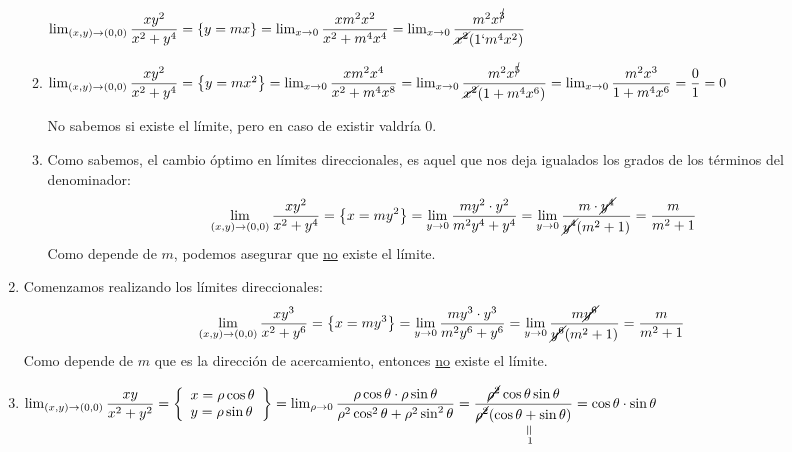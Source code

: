\begin{enumerate}[label=\color{red}\textbf{\arabic*)}, leftmargin=*]
\begin{enumerate}[label=\color{red}\alph*)]
			$\lim_{(x,y)\to(0,0)}\dfrac{xy^2}{x^2+y^4}=\left\{y=mx\right\}=\lim_{x\to0}\dfrac{xm^2x^2}{x^2+m^4x^4}=\lim_{x\to0}\dfrac{m^2x^{\cancel{3}}}{\cancel{x^2}(1`m^4x^2)}$
			\item {}
			
			$\lim_{(x,y)\to(0,0)}\dfrac{xy^2}{x^2+y^4}=\left\{y=mx^2\right\}=\lim_{x\to0}\dfrac{xm^2x^4}{x^2+m^4x^8}=\lim_{x\to0}\dfrac{m^2x^{\cancel{5}}}{\cancel{x^2}(1+m^4x^6)}=\lim_{x\to0}\dfrac{m^2x^3}{1+m^4x^6}=\dfrac{0}{1}=0$
			
			No sabemos si existe el límite, pero en caso de existir valdría $0$.
			\item {}
			
			Como sabemos, el cambio óptimo en límites direccionales, es aquel que nos deja igualados los grados de los términos del denominador: \[ \lim_{(x,y)\to(0,0)}\dfrac{xy^2}{x^2+y^4}=\left\{x=my^2\right\}=\lim_{y\to0}\dfrac{my^2\cdot y^2}{m^2y^4+y^4}=\lim_{y\to0}\dfrac{m\cdot\cancel{y^4}}{\cancel{y^4}(m^2+1)}=\dfrac{m}{m^2+1} \]
			Como depende de $m$, podemos asegurar que \underline{no} existe el límite.
		\end{enumerate}
		\item {}
		Comenzamos realizando los límites direccionales: \[ \lim_{(x,y)\to(0,0)}\dfrac{xy^3}{x^2+y^6}=\left\{x=my^3\right\}=\lim_{y\to0}\dfrac{my^3\cdot y^3}{m^2y^6+y^6}=\lim_{y\to0}\dfrac{m\cancel{y^6}}{\cancel{y^6}(m^2+1)}=\dfrac{m}{m^2+1} \]
		Como depende de $m$ que es la dirección de acercamiento, entonces \underline{no} existe el límite.
		\item {}
		$\lim_{(x,y)\to(0,0)}\dfrac{xy}{x^2+y^2}=\left\{\begin{array}{l}
		x=\rho\cos\theta\\
		y=\rho\sin\theta
		\end{array}\right\}=\lim_{\rho\to0}\dfrac{\rho\cos\theta\cdot\rho\sin\theta}{\rho^2\cos^2\theta+\rho^2\sin^2\theta}=\dfrac{\cancel{\rho^2}\cos\theta\sin\theta}{\cancel{\rho^2}\underset{\begin{subarray}{c}
		\rotatebox{90}{=}\\
		1
		\end{subarray}}{(\cos\theta+\sin\theta)}}=\cos\theta\cdot\sin\theta$
		

\end{enumerate}
